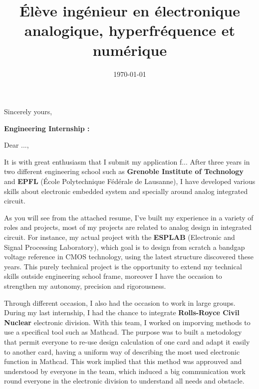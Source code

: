 \documentclass[11pt,a4paper]{moderncv}
\title{Élève ingénieur en électronique analogique, hyperfréquence et numérique}
\newcommand{\entreprise}{Entreprise}
\begin{document}

\recipient{\entreprise}{RUE,\\ CP VILLE,\\ PAYS} %
\date{\today} %
\opening{} %
\closing{Sincerely yours,} %

\makelettertitle %
\justify

\textbf{Engineering Internship :  }
\newline{}

Dear ...,\newline{}

\hspace{0.8cm} It is with great enthusiasm that I submit my application f...
After three years in two different engineering school such as \textbf{Grenoble Institute of Technology} and \textbf{EPFL} (École Polytechnique Fédérale de Lausanne), I have developed various skills about electronic embedded system and specially around analog integrated circuit.


\hspace{0.8cm} As you will see from the attached resume, I’ve built my experience in a variety of roles and projects, most of my projects are related to analog design in integrated circuit. For instance, my actual project with the \textbf{ESPLAB} (Electronic and Signal Processing Laboratory), which goal is to design from scratch a bandgap voltage reference in CMOS technology, using the latest structure discovered these years. This purely technical project is the opportunity to extend my technical skills outside engineering school frame, moreover I have the occasion to strengthen my autonomy, precision and rigorousness.

\hspace{0.8cm} Through different occasion, I also had the occasion to work in large groups. During my last internship, I had the chance to integrate \textbf{Rolls-Royce Civil Nuclear} electronic division.
With this team, I worked on imporving methods to use a specifical tool such as Mathcad. 
The purpose was to built a metodology that permit everyone to re-use design calculation of one card and adapt it easily to another card, having a uniform way of describing the most used electronic function in Mathcad. 
This work implied that this method was approuved and understood by everyone in the team, which induced a big communication work round everyone in the electronic division to understand all needs and obstacle. 
\end{document}
